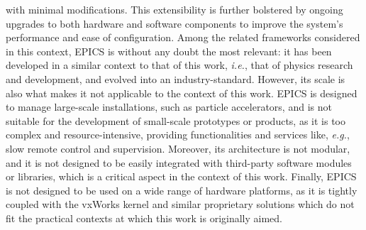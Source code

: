 with minimal modifications. This extensibility is further bolstered by ongoing upgrades to both hardware and software components to improve the system's performance and ease of configuration. Among the related frameworks considered in this context, EPICS is without any doubt the most relevant: it has been developed in a similar context to that of this work, \emph{i.e.}, that of physics research and development, and evolved into an industry-standard. However, its scale is also what makes it not applicable to the context of this work. EPICS is designed to manage large-scale installations, such as particle accelerators, and is not suitable for the development of small-scale prototypes or products, as it is too complex and resource-intensive, providing functionalities and services like, \emph{e.g.}, slow remote control and supervision. Moreover, its architecture is not modular, and it is not designed to be easily integrated with third-party software modules or libraries, which is a critical aspect in the context of this work. Finally, EPICS is not designed to be used on a wide range of hardware platforms, as it is tightly coupled with the vxWorks kernel and similar proprietary solutions which do not fit the practical contexts at which this work is originally aimed.

